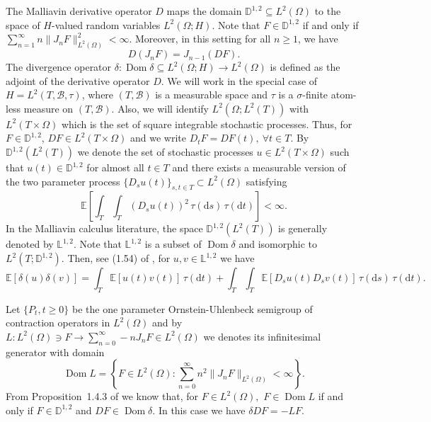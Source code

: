 \documentclass{article}
\newcommand{\mathd}{\mathrm{d}}
\newcommand{\tmop}[1]{\ensuremath{\operatorname{#1}}}
\begin{document}
The Malliavin derivative operator $D$ maps the domain $\mathbb{D}^{1, 2}
\subseteq L^2 (\Omega) $ to the space of $H$-valued random variables $L^2
(\Omega ; H) .$ Note that $F \in \mathbb{D}^{1, 2}$ if and only if $\sum_{n =
1}^{\infty} n \| J_n F \|_{L^2 (\Omega)}^2 < \infty$. Moreover, in this
setting for all $n \geqslant 1$, we have
%
\begin{equation}\label{DandJrelation}
  D (J_n F) = J_{n - 1} (D F) . 
\end{equation}
%
The divergence operator $\delta : \tmop{Dom} \delta \subseteq L^2 (\Omega ; H)
\rightarrow L^2 (\Omega)$ is defined as the adjoint of the derivative operator
$D$. We will work in the special case of $H = L^2 (T, \mathcal{B}, \tau)$,
where $(T, \mathcal{B})$ is a measurable space and $\tau$ is a $\sigma$-finite
atom-less measure on $(T, \mathcal{B})$. Also, we will identify $L^2 (\Omega ;
L^2 (T))$ with $L^2 (T \times \Omega)$ which is the set of square integrable
stochastic processes. Thus, for $F \in \mathbb{D}^{1, 2}$, $D F \in L^2 (T
\times \Omega)$ and we write $D_t F = D F (t), ~ \forall t \in T$.
%
By $\mathbb{D}^{1, 2} (L^2 (T))$ we denote the set of stochastic processes $u
\in L^2 (T \times \Omega)$ such that $u (t) \in \mathbb{D}^{1, 2}$ for almost all $t \in T$ and there exists a measurable version of the two parameter process $\{ D_s u (t) \}_{s, t \in T} \subset L^2 (\Omega)$ satisfying
%
\[ \mathbb{E} \left[ \int_T \int_T (D_s u (t))^2 \, \tau(\mathd s)\,  \tau (\mathd t)
   \right] < \infty . \]
In the Malliavin calculus literature, the space $\mathbb{D}^{1, 2} (L^2 (T))$
is generally denoted by $\mathbb{L}^{1, 2}$. Note that $\mathbb{L}^{1, 2}$ is
a subset of $\tmop{Dom} \delta$ and isomorphic to $L^2 (T ; \mathbb{D}^{1, 2})
.$ Then, see (1.54) of {\cite{Nualart2006}}, for $u, v \in \mathbb{L}^{1, 2}$
we have
\begin{equation}
  \mathbb{E} [\delta (u) \delta (v)] = \int_T \mathbb{E} [u (t) v (t)] \, \tau
  (\mathd t) + \int_T \int_T \mathbb{E} [D_s u (t) D_s v (t)] \, \tau (\mathd s)\,  \tau
  (\mathd t) . \label{LandDrelation}
\end{equation}


Let $\{ P_t, t \geqslant 0 \}$ be the one parameter Ornstein-Uhlenbeck
semigroup of contraction operators in $L^2 (\Omega)$ and by $L : L^2 (\Omega)
\ni F \rightarrow \sum_{n = 0}^{\infty} - n J_n F \in L^2 (\Omega)$ we denotes
its infinitesimal generator with domain
\[ \tmop{Dom} L = \left\{ F \in L^2 (\Omega) : \sum_{n = 0}^{\infty} n^2 \|
   J_n F \|_{L^2 (\Omega)} < \infty \right\} . \]
From Proposition~1.4.3 of {\cite{Nualart2006}} we know that, for $F \in L^2
(\Omega),$ $F \in \tmop{Dom} L$ if and only if $F \in \mathbb{D}^{1, 2}$ and
$D F \in \tmop{Dom} \delta$. In this case we have $\delta D F = - L F.$
\end{document}

